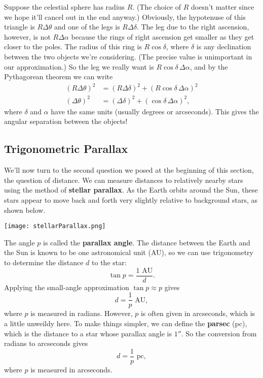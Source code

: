 \documentclass[../a062main.tex]{subfiles}
\begin{document}
Suppose the celestial sphere has radius $R$.
(The choice of $R$ doesn't matter since we hope it'll cancel out in the end anyway.)
Obviously, the hypotenuse of this triangle is $R \Delta \theta$ and one of the legs is $R \Delta \delta$.
The leg due to the right ascension, however, is not $R \Delta \alpha$ because the rings of right ascension get smaller as they get closer to the poles.
The radius of this ring is $R \cos \delta$, where $\delta$ is any declination between the two objects we're considering.
(The precise value is unimportant in our approximation.)
So the leg we really want is $R \cos \delta \,\Delta \alpha$, and by the Pythagorean theorem we can write
\begin{align*}
    (R \Delta \theta)^2 &= (R \Delta \delta)^2 + (R \cos \delta \,\Delta \alpha)^2 \\
    (\Delta \theta)^2 &= (\Delta \delta)^2 + (\cos \delta \,\Delta \alpha)^2,
\end{align*}
where $\delta$ and $\alpha$ have the same units (usually degrees or arcseconds).
This gives the angular separation between the objects!

\subsection*{Trigonometric Parallax}
We'll now turn to the second question we posed at the beginning of this section, the question of distance.
We can measure distances to relatively nearby stars using the method of \textbf{stellar parallax}.
As the Earth orbits around the Sun, these stars appear to move back and forth very slightly relative to background stars, as shown below.
\begin{center}
    \texttt{[image: stellarParallax.png]}
\end{center}
The angle $p$ is called the \textbf{parallax angle}.
The distance between the Earth and the Sun is known to be one astronomical unit (AU), so we can use trigonometry to determine the distance $d$ to the star:
\[ \tan p = \frac{1 \text{ AU}}{d}. \]
Applying the small-angle approximation $\tan p \approx p$ gives
\[ \boxed{d = \frac{1}{p} \text{ AU}}, \]
where $p$ is measured in radians.
However, $p$ is often given in arcseconds, which is a little unweildy here.
To make things simpler, we can define the \textbf{parsec} (pc), which is the distance to a star whose parallax angle is $1''$.
So the conversion from radians to arcseconds gives
\[ \boxed{d = \frac{1}{p} \text{ pc}}, \]
where $p$ is measured in arcseconds.
\end{document}
